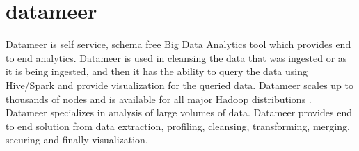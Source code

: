 \section{datameer}
Datameer is self service, schema free Big Data Analytics tool which provides end to end analytics. Datameer is used in cleansing the data that was ingested or as it is being ingested, and then it has the ability to query the data using Hive/Spark and provide visualization for the queried data. Datameer scales up to thousands of nodes and is available for all major Hadoop distributions \cite{datameer}. Datameer specializes in analysis of large volumes of data. Datameer provides end to end solution from data extraction, profiling, cleansing, transforming, merging, securing and finally visualization.
